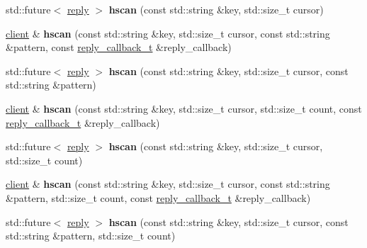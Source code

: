 \begin{DoxyCompactItemize}
std\+::future$<$ \hyperlink{classcpp__redis_1_1reply}{reply} $>$ {\bfseries hscan} (const std\+::string \&key, std\+::size\+\_\+t cursor)
\item 
\mbox{\label{classcpp__redis_1_1client_a493ce9060e1cd4424d892ade5aab4513}} 
\hyperlink{classcpp__redis_1_1client}{client} \& {\bfseries hscan} (const std\+::string \&key, std\+::size\+\_\+t cursor, const std\+::string \&pattern, const \hyperlink{classcpp__redis_1_1client_a061a1140d36d2eaeda82b09a0bb3f9f2}{reply\+\_\+callback\+\_\+t} \&reply\+\_\+callback)
\item 
\mbox{\label{classcpp__redis_1_1client_a0eea61815c7fb9b0bd2477ba8d6746eb}} 
std\+::future$<$ \hyperlink{classcpp__redis_1_1reply}{reply} $>$ {\bfseries hscan} (const std\+::string \&key, std\+::size\+\_\+t cursor, const std\+::string \&pattern)
\item 
\mbox{\label{classcpp__redis_1_1client_a98a4dc7506680b33cf3eb9ce8a8b6b15}} 
\hyperlink{classcpp__redis_1_1client}{client} \& {\bfseries hscan} (const std\+::string \&key, std\+::size\+\_\+t cursor, std\+::size\+\_\+t count, const \hyperlink{classcpp__redis_1_1client_a061a1140d36d2eaeda82b09a0bb3f9f2}{reply\+\_\+callback\+\_\+t} \&reply\+\_\+callback)
\item 
\mbox{\label{classcpp__redis_1_1client_acad881c681f9ca774ee337c30b4bafed}} 
std\+::future$<$ \hyperlink{classcpp__redis_1_1reply}{reply} $>$ {\bfseries hscan} (const std\+::string \&key, std\+::size\+\_\+t cursor, std\+::size\+\_\+t count)
\item 
\mbox{\label{classcpp__redis_1_1client_aca43b4d4f54076aa0b0a9a3c14863e7c}} 
\hyperlink{classcpp__redis_1_1client}{client} \& {\bfseries hscan} (const std\+::string \&key, std\+::size\+\_\+t cursor, const std\+::string \&pattern, std\+::size\+\_\+t count, const \hyperlink{classcpp__redis_1_1client_a061a1140d36d2eaeda82b09a0bb3f9f2}{reply\+\_\+callback\+\_\+t} \&reply\+\_\+callback)
\item 
\mbox{\label{classcpp__redis_1_1client_a9d66932a3fdbcf062b436789b6850148}} 
std\+::future$<$ \hyperlink{classcpp__redis_1_1reply}{reply} $>$ {\bfseries hscan} (const std\+::string \&key, std\+::size\+\_\+t cursor, const std\+::string \&pattern, std\+::size\+\_\+t count)

\end{DoxyCompactItemize}
